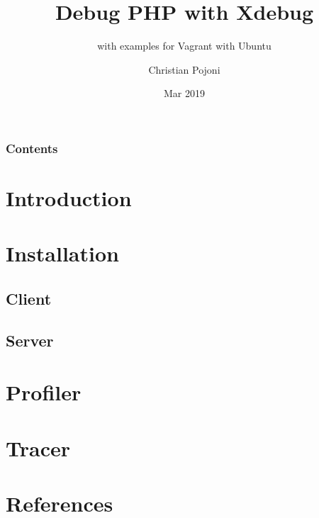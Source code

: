 \documentclass[
    hyperref={bookmarks=true}
]{beamer}
\title{Debug PHP with Xdebug}
\subtitle{with examples for Vagrant with Ubuntu}
\author{Christian Pojoni}
\institute{\url{www.secret-source.eu}}
\date{Mar 2019}
\begin{document}
\frame{\titlepage}
\begin{frame}\frametitle{Contents}
    \tableofcontents
\end{frame}

\section{Introduction}


\section{Installation} 
\subsection{Client}


\subsection{Server}


\section{Profiler}


\section{Tracer}


\section*{References}\addtocounter{section}{1}

\end{document}
